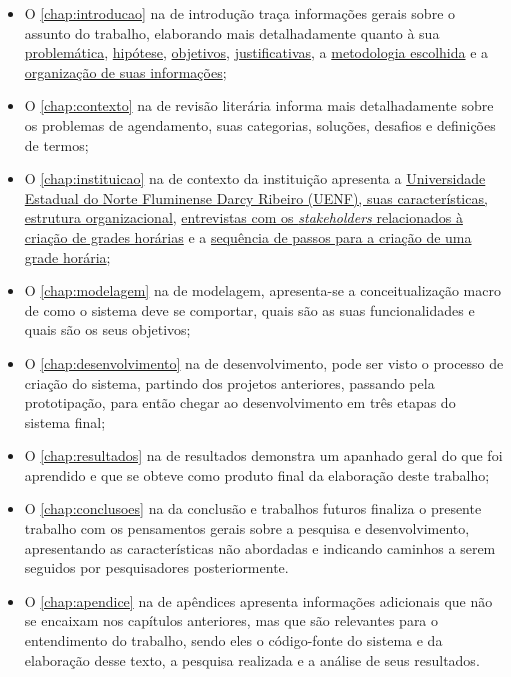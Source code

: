 \begin{itemize}
  \item O \autoref{chap:introducao} na  de introdução traça informações gerais sobre o assunto do trabalho, elaborando mais detalhadamente quanto à sua \hyperref[sec:Problemáticas]{problemática}, \hyperref[sec:Hipótese]{hipótese}, \hyperref[sec:Objetivos]{objetivos}, \hyperref[sec:Justificativas]{justificativas}, a \hyperref[sec:Metodologia]{metodologia escolhida} e a \hyperref[sec:Organização]{organização de suas informações};
  \item O \autoref{chap:contexto} na  de revisão literária informa mais detalhadamente sobre os problemas de agendamento, suas categorias, soluções, desafios e definições de termos;
  \item O \autoref{chap:instituicao} na  de contexto da instituição apresenta a \hyperref[sec:estatuto]{Universidade Estadual do Norte Fluminense Darcy Ribeiro (UENF), suas características, estrutura organizacional}, \hyperref[sec:entrevistas]{entrevistas com os \textit{stakeholders} relacionados à criação de grades horárias} e a \hyperref[sec:sequencia]{sequência de passos para a criação de uma grade horária};
  \item O \autoref{chap:modelagem} na  de modelagem, apresenta-se a conceitualização macro de como o sistema deve se comportar, quais são as suas funcionalidades e quais são os seus objetivos;
  \item O \autoref{chap:desenvolvimento} na  de desenvolvimento, pode ser visto o processo de criação do sistema, partindo dos projetos anteriores, passando pela prototipação, para então chegar ao desenvolvimento em três etapas do sistema final;
  \item O \autoref{chap:resultados} na  de resultados demonstra um apanhado geral do que foi aprendido e que se obteve como produto final da elaboração deste trabalho;
  \item O \autoref{chap:conclusoes} na  da conclusão e trabalhos futuros finaliza o presente trabalho com os pensamentos gerais sobre a pesquisa e desenvolvimento, apresentando as características não abordadas e indicando caminhos a serem seguidos por pesquisadores posteriormente.
  \item O \autoref{chap:apendice} na  de apêndices apresenta informações adicionais que não se encaixam nos capítulos anteriores, mas que são relevantes para o entendimento do trabalho, sendo eles o código-fonte do sistema e da elaboração desse texto, a pesquisa realizada e a análise de seus resultados.
\end{itemize}
